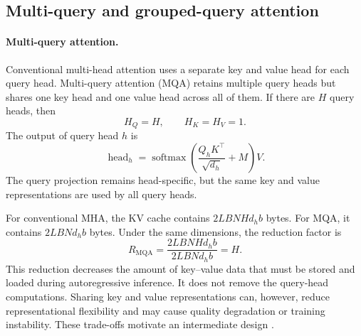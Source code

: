 \subsection{Multi-query and grouped-query attention}
\label{subsec:attn-mqa-gqa}

\paragraph{Multi-query attention.}
Conventional multi-head attention uses a separate key and value head for
each query head. Multi-query attention (MQA) retains multiple query heads
but shares one key head and one value head across all of them. If there
are \(H\) query heads, then
\begin{equation}
    H_Q=H,
    \qquad
    H_K=H_V=1.
    \label{eq:attn-mqa-head-counts}
\end{equation}
The output of query head \(h\) is
\begin{equation}
    \operatorname{head}_h
    =
    \operatorname{softmax}
    \left(
        \frac{Q_hK^\top}{\sqrt{d_h}}+M
    \right)V.
    \label{eq:attn-mqa-head}
\end{equation}
The query projection remains head-specific, but the same key and value
representations are used by all query heads.

For conventional MHA, the KV cache contains
\(2LBNHd_hb\) bytes. For MQA, it contains
\(2LBNd_hb\) bytes. Under the same dimensions, the reduction factor is
\begin{equation}
    R_{\mathrm{MQA}}
    =
    \frac{2LBNHd_hb}{2LBNd_hb}
    =
    H.
    \label{eq:attn-mqa-cache-reduction}
\end{equation}
This reduction decreases the amount of key--value data that must be stored
and loaded during autoregressive inference. It does not remove the
query-head computations. Sharing key and value representations can,
however, reduce representational flexibility and may cause quality
degradation or training instability. These trade-offs motivate an
intermediate design \parencite{ainslie2023gqa}.

